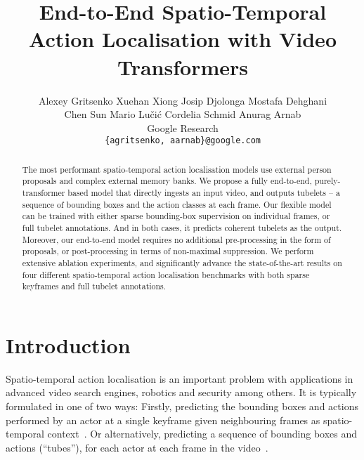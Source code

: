 \documentclass[10pt,twocolumn,letterpaper]{article}
\begin{document}
\title{End-to-End Spatio-Temporal Action Localisation with Video Transformers}


\author{Alexey Gritsenko \quad Xuehan Xiong \quad Josip Djolonga \quad Mostafa Dehghani \\ \quad Chen Sun \quad Mario Lučić  \quad  Cordelia Schmid \quad Anurag Arnab \\
	Google Research \\
	{\tt\small \{agritsenko, aarnab\}@google.com}
}


\maketitle
\ificcvfinal\thispagestyle{empty}\fi


\begin{abstract}
The most performant spatio-temporal action localisation models use external person proposals and complex external memory banks.
We propose a fully end-to-end, purely-transformer based model that directly ingests an input video, and outputs tubelets -- a sequence of bounding boxes and the action classes at each frame.
Our flexible model can be trained with either sparse bounding-box supervision on individual frames, or full tubelet annotations. And in both cases, it predicts coherent tubelets as the output.
Moreover, our end-to-end model requires no additional pre-processing in the form of proposals, or post-processing in terms of non-maximal suppression.
We perform extensive ablation experiments, and significantly advance the state-of-the-art results on four different spatio-temporal action localisation benchmarks
with both sparse keyframes and full tubelet annotations.
\end{abstract} 

\section{Introduction}

Spatio-temporal action localisation is an important problem with applications in advanced video search engines, robotics and security among others.
It is typically formulated in one of two ways: Firstly, predicting the bounding boxes and actions performed by an actor at a single keyframe given neighbouring frames as spatio-temporal context~\cite{gu_cvpr_2018,li2020ava}.
Or alternatively, predicting a sequence of bounding boxes and actions (\ie ``tubes''), for each actor at each frame in the video~\cite{soomro_arxiv_2012,jhuang2013towards}. 
\end{document}
